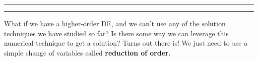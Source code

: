 \documentclass[12pt]{amsart}
\newcommand{\<}{\langle}
\renewcommand{\>}{\rangle}
\numberwithin{equation}{section}
\begin{document}
	\pagestyle{empty}

	\noindent\rule{7.6in}{0.4pt}

	\begin{center}  
	\end{center}

	\noindent\rule{7in}{0.4pt} \vspace{0.25cm}
		
	\noindent  What if we have a higher-order DE, and we can't use any of the solution techniques
	we have studied so far?  Is there some way we can leverage this numerical technique to get a 
	solution?  Turns out there is!  We just need to use a simple change of variables called
	\textbf{reduction of order.}

	\medskip
\end{document}
